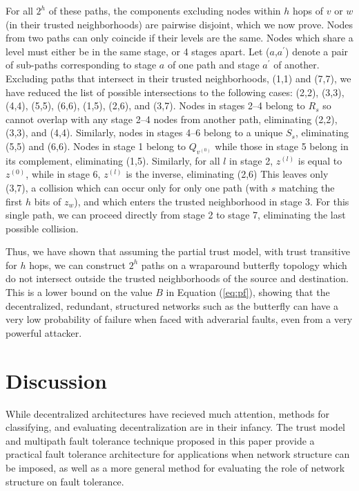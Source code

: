 \documentclass[prodmode,permissions]{acmsmall-ec16}
\begin{document}
For all $2^h$ of these paths, the components excluding nodes within $h$ hops
of $v$ or $w$ (in their trusted neighborhoods) are pairwise disjoint,
which we now prove.
Nodes from two paths can only coincide if their levels are the same.
Nodes which share a level must either be in the same stage, or 4 stages
apart.
Let ($a$,$a^\prime$) denote a pair of sub-paths corresponding to stage $a$ of
one path and stage $a^\prime$ of another.
Excluding paths that intersect in their trusted neighborhoods, (1,1) and (7,7),
we have reduced the list of possible intersections to the following cases:
(2,2), (3,3), (4,4), (5,5), (6,6), (1,5), (2,6), and (3,7).
Nodes in stages 2--4 belong to $R_s$ so cannot overlap with any stage 2--4
nodes from another path, eliminating (2,2), (3,3), and (4,4).
Similarly, nodes in stages 4--6 belong to a unique $S_s$,
eliminating (5,5) and (6,6).
Nodes in stage 1 belong to $Q_{v^{(0)}}$ while those in stage 5 belong in
its complement, eliminating (1,5).
Similarly, for all $l$ in stage 2, $z^{(l)}$ is equal to $z^{(0)}$,
while in stage 6, $z^{(l)}$ is the inverse, eliminating (2,6)
This leaves only (3,7), a collision which can occur only for only one path
(with $s$ matching the first $h$ bits of $z_w$), and which enters the trusted
neighborhood in stage 3.
For this single path, we can proceed directly from stage 2 to stage 7,
eliminating the last possible collision.

Thus, we have shown that assuming the partial trust model, with trust transitive
for $h$ hops, we can construct $2^h$ paths on a wraparound butterfly topology
which do not intersect outside the trusted neighborhoods of the source and
destination.
This is a lower bound on the value $B$ in Equation (\ref{eq:pf}),
showing that the decentralized, redundant, structured networks such as the
butterfly can have a very low probability of failure when faced with
adverarial faults, even from a very powerful attacker.

\section{Discussion}

While decentralized architectures have recieved much attention,
methods for classifying, and evaluating decentralization
are in their infancy.
The trust model and multipath fault tolerance technique proposed in this
paper provide a practical fault tolerance architecture for applications when
network structure can be imposed,
as well as a more general method for evaluating the role of network structure
on fault tolerance.
\end{document}
